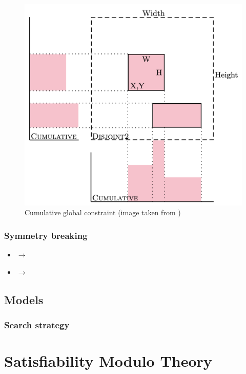 \documentclass[a4paper,10pt]{article}
\newcommand{\xmark}{\ding{55}}%
\newcounter{subsubsubsection}[subsubsection]
\begin{document}
 \label{sec:cumulative}
\begin{figure}
   \centering
   \includegraphics[scale=0.2]{cumulative.png}
   \caption{Cumulative global constraint (image taken from \cite{cumulative})}
\end{figure}

 \label{sec:stack-two}
 \label{sec:column-stacking}

\subsubsection{Symmetry breaking}
\begin{itemize}
   \item {} $\rightarrow$ 
   \item {} $\rightarrow$ \xmark
\end{itemize}

 \label{sec:biggest-lower-left}
 \label{sec:areas-ordering}
 \label{sec:width-ordering}


\subsection{Models}

\subsubsection*{Search strategy}

\section{Satisfiability Modulo Theory}

\printbibliography
\end{document}
